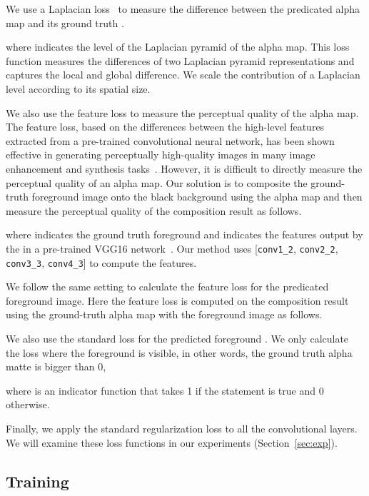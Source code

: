 \documentclass[10pt,twocolumn,letterpaper]{article}
\begin{document}
We use a Laplacian loss~\cite{niklaus2018context} to measure the difference between the predicated alpha map  and its ground truth .

where  indicates the  level of the Laplacian pyramid of the alpha map. This loss function measures the differences of two Laplacian pyramid representations and captures the local and global difference. We scale the contribution of a Laplacian level according to its spatial size.

We also use the feature loss to measure the perceptual quality of the alpha map. The feature loss, based on the differences between the high-level features extracted from a pre-trained convolutional neural network, has been shown effective in generating perceptually high-quality images in many image enhancement and synthesis tasks~\cite{dosovitskiy2016generating, ledig2017photo, niklaus2018context, niklaus2017video, sajjadi2017enhancenet,zhang2018unreasonable, zhu2016generative}. However, it is difficult to directly measure the perceptual quality of an alpha map. Our solution is to composite the ground-truth foreground image onto the black background using the alpha map and then measure the perceptual quality of the composition result as follows.

where  indicates the ground truth foreground and  indicates the features output by the  in a pre-trained VGG16 network~\cite{simonyan2014very}. Our method uses  [\texttt{conv1\_2}, \texttt{conv2\_2}, \texttt{conv3\_3}, \texttt{conv4\_3}] to compute the features.

We follow the same setting to calculate the feature loss for the predicated foreground image. Here the feature loss  is computed on the composition result using the ground-truth alpha map with the foreground image as follows.


We also use the standard  loss for the predicted foreground . We only calculate the loss where the foreground is visible, in other words, the ground truth alpha matte is bigger than 0,

where  is an indicator function that takes 1 if the statement is true and 0 otherwise.

Finally, we apply the standard  regularization loss to all the convolutional layers.  We will examine these loss functions in our experiments (Section~\ref{sec:exp}).


\subsection{Training}
\label{sec:train}
\end{document}
